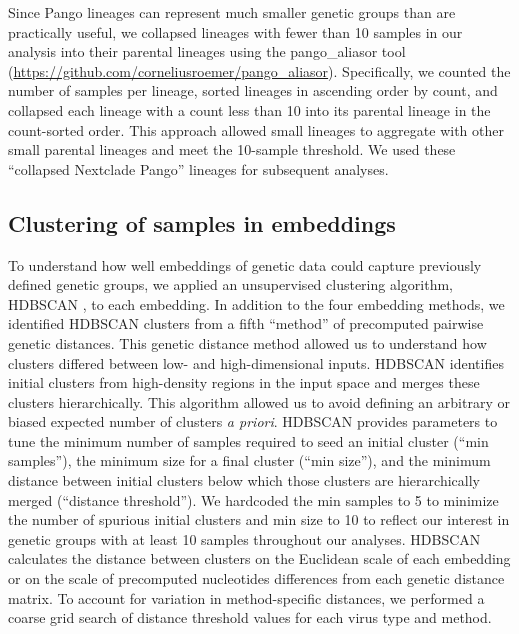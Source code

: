 \documentclass[webpdf,contemporary,large,single]{oup-authoring-template}%
\theoremstyle{thmstyleone}%
\theoremstyle{thmstyletwo}%
\theoremstyle{thmstylethree}%
\begin{document}
Since Pango lineages can represent much smaller genetic groups than are practically useful, we collapsed lineages with fewer than 10 samples in our analysis into their parental lineages using the pango\_aliasor tool (\href{https://github.com/corneliusroemer/pango_aliasor}{https://github.com/corneliusroemer/pango\_aliasor}).
Specifically, we counted the number of samples per lineage, sorted lineages in ascending order by count, and collapsed each lineage with a count less than 10 into its parental lineage in the count-sorted order.
This approach allowed small lineages to aggregate with other small parental lineages and meet the 10-sample threshold.
We used these ``collapsed Nextclade Pango'' lineages for subsequent analyses.

\subsection{Clustering of samples in embeddings}

To understand how well embeddings of genetic data could capture previously defined genetic groups, we applied an unsupervised clustering algorithm, HDBSCAN \citep{campello2015hierarchical}, to each embedding.
In addition to the four embedding methods, we identified HDBSCAN clusters from a fifth ``method'' of precomputed pairwise genetic distances.
This genetic distance method allowed us to understand how clusters differed between low- and high-dimensional inputs.
HDBSCAN identifies initial clusters from high-density regions in the input space and merges these clusters hierarchically.
This algorithm allowed us to avoid defining an arbitrary or biased expected number of clusters \emph{a priori}.
HDBSCAN provides parameters to tune the minimum number of samples required to seed an initial cluster (``min samples''), the minimum size for a final cluster (``min size''), and the minimum distance between initial clusters below which those clusters are hierarchically merged (``distance threshold'').
We hardcoded the min samples to 5 to minimize the number of spurious initial clusters and min size to 10 to reflect our interest in genetic groups with at least 10 samples throughout our analyses.
HDBSCAN calculates the distance between clusters on the Euclidean scale of each embedding or on the scale of precomputed nucleotides differences from each genetic distance matrix.
To account for variation in method-specific distances, we performed a coarse grid search of distance threshold values for each virus type and method.
\end{document}
